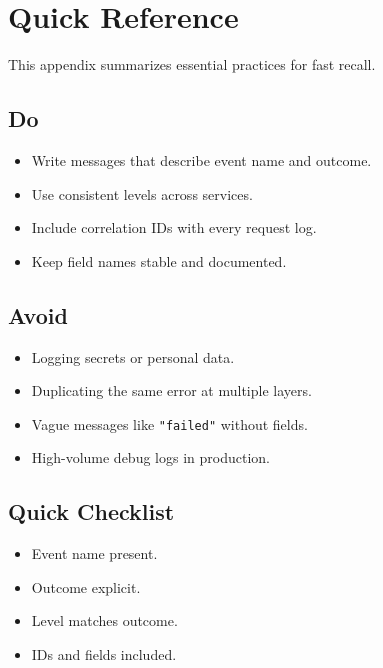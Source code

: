 \chapter{Quick Reference}
This appendix summarizes essential practices for fast recall.

\section{Do}
\begin{itemize}
\item Write messages that describe event name and outcome.
\item Use consistent levels across services.
\item Include correlation IDs with every request log.
\item Keep field names stable and documented.
\end{itemize}

\section{Avoid}
\begin{itemize}
\item Logging secrets or personal data.
\item Duplicating the same error at multiple layers.
\item Vague messages like \texttt{"failed"} without fields.
\item High-volume debug logs in production.
\end{itemize}

\section{Quick Checklist}
\begin{itemize}
\item Event name present.
\item Outcome explicit.
\item Level matches outcome.
\item IDs and fields included.
\end{itemize}

